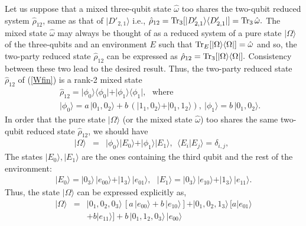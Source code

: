 \documentclass[pra,preprint,a4paper,superscriptaddress]{revtex4}
\begin{document}
{Let us suppose that a mixed  three-qubit state $\hat\omega$ too shares the  two-qubit reduced system $\hat{\rho}_{12}$, 
same as that of $\vert D'_{2,1}\rangle$ i.e., $\hat{\rho}_{12}={\rm Tr}_{3}[\vert D_{2,1}'\rangle\langle 
D_{2,1}'\vert]={\rm Tr}_{3}\,\hat{\omega}.$  The mixed state $\hat{\omega}$ may always be thought of as a reduced system of a 
pure state  $\vert\Omega\rangle$ of the three-qubits and an environment $E$ such that ${\rm 
Tr}_{E}[\vert\Omega\rangle\langle \Omega\vert]=\hat\omega$ and so, the two-party reduced state $\hat{\rho}_{12}$ can be 
expressed  as  $\hat{\rho}_{12}={\rm Tr}_{3}[\vert \Omega\rangle\langle \Omega\vert].$
Consistency between these two lead to the desired result. Thus, the two-party reduced  state $\hat{\rho}_{12}$ of %
(\ref{Wfin}) is a rank-2 mixed state 
\begin{eqnarray}
\label{wp2}
&&\hat{\rho}_{12}=\vert \phi_0\rangle\langle \phi_0\vert + 
\vert \phi_1\rangle\langle \phi_1\vert, \ \ \ \mbox{where} \\ 
& & \vert \phi_0\rangle= a\, \vert 0_1,0_2\rangle + b\, (\vert 1_1, 0_2\rangle
 +\vert 0_1,1_2\rangle),\  
   \vert \phi_1\rangle= b\, \vert 0_1,0_2\rangle. \nonumber
\end{eqnarray}
In order that the  pure state $\vert\Omega\rangle$ (or the mixed state $\hat\omega$) too shares the same 
two-qubit reduced state $\hat{\rho}_{12}$, we should have 
\begin{eqnarray}
\label{wp3}
\vert\Omega\rangle&=&\vert \phi_0\rangle\vert E_0\rangle +\vert \phi_1\rangle\vert E_1\rangle, \ \  
\langle E_i\vert E_j\rangle=\delta_{i,j},\ \ 
\end{eqnarray}     
The states $\vert E_{0}\rangle, \vert E_{1}\rangle$ are the ones containing the third qubit and the rest of the %
environment:    
\begin{eqnarray*}   
\vert E_0\rangle=\vert 0_3\rangle\,  \vert e_{00}\rangle+\vert 1_3\rangle\,  \vert e_{01}\rangle,\ \ \ 
 \vert E_1\rangle=\vert 0_3\rangle\,  \vert e_{10}\rangle+\vert 1_3\rangle\,  \vert e_{11}\rangle.   
\end{eqnarray*}
Thus, the state $\vert \Omega\rangle$ can be expressed explicitly as, %
\begin{eqnarray}
\label{omega}
\vert \Omega\rangle&=& \vert 0_1,0_2,0_3\rangle\, [a\,\vert e_{00}\rangle+b\, \vert e_{10}\rangle] 
+ \vert 
0_1,0_2,1_3\rangle\, [a\vert e_{01}\rangle\nonumber \\
&&+b\vert e_{11}\rangle]+ b\,  \vert 0_1,1_2,0_3\rangle\,\vert e_{00}\rangle  

\end{eqnarray}}
\end{document}

